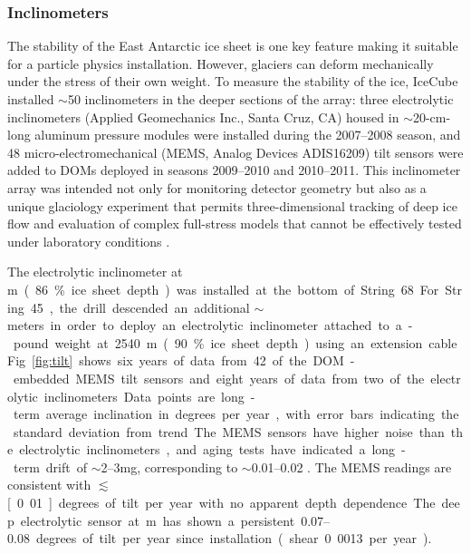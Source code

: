 \subsubsection{Inclinometers}  

The stability of the East Antarctic ice sheet is one key feature making it
suitable for a particle physics installation.  However, glaciers can
deform mechanically under the stress of their own weight.  To measure the
stability of the ice, IceCube installed $\sim$50
inclinometers in the deeper sections of the array: three 
electrolytic inclinometers (Applied Geomechanics Inc., Santa Cruz, CA)
housed in $\sim$20-cm-long aluminum pressure modules were installed during
the 2007--2008 season, and 48 micro-electromechanical (MEMS, Analog Devices
ADIS16209) tilt sensors were added to DOMs deployed in seasons 2009--2010 and
2010--2011.  This inclinometer array was intended not only for monitoring
detector geometry but also as a unique glaciology experiment that
permits three-dimensional tracking of deep ice flow and evaluation of complex
full-stress models that cannot be effectively tested under laboratory
conditions \cite{pattyn03}.

The electrolytic inclinometer at \unit[2455]m (86\% ice sheet depth) was
installed at the bottom of String 68.  For String 45, the drill
descended an additional $\sim$\unit[100]meters in order to deploy an
electrolytic inclinometer attached to a \unit[100]-pound weight at 2540 m
(90\% ice sheet depth) using an extension cable.  Fig.~\ref{fig:tilt} shows
six years of data from 42 of the DOM-embedded MEMS tilt sensors and
eight years of data from two of the electrolytic inclinometers.  Data
points are long-term average inclination in degrees per year, with error
bars indicating the standard deviation from trend.  The MEMS sensors have
higher noise than the electrolytic inclinometers, and aging tests have indicated a long-term
drift of $\sim$\numrange[range-phrase = --]{2}{3}mg, corresponding to
$\sim$\numrange[range-phrase = --]{0.01}{0.02}
\cite{inclinometer_comm}. The MEMS readings are consistent with
$\lesssim$\unit[0.01]degrees of tilt per year with no apparent depth
dependence.  The deep electrolytic sensor 
at \unit[2540]m has shown a persistent \numrange[range-phrase =
  --]{0.07}{0.08} degrees of tilt per year since installation (shear 0.0013
per year).

